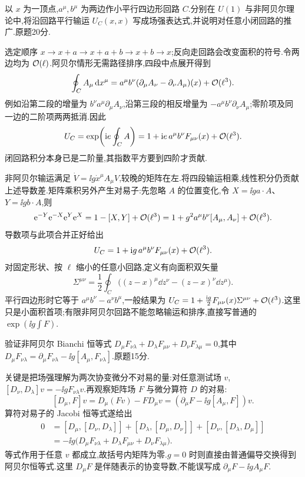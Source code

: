 \begin{exercise}
以 $x$ 为一顶点,$a^\mu,b^\mu$ 为两边作小平行四边形回路 $C$.分别在 $U(1)$ 与非阿贝尔理论中,将沿回路平行输运 $U_C(x,x)$ 写成场强表达式,并说明对任意小闭回路的推广.原题20分.
\end{exercise}
\begin{solution}
选定顺序 $x\to x+a\to x+a+b\to x+b\to x$;反向走回路会改变面积的符号.令两边均为 $\mathcal O(\ell)$.阿贝尔情形无需路径排序,四段中点展开得到
\[
\oint_C A_\mu\,\mathrm d x^\mu
=a^\mu b^\nu(\partial_\mu A_\nu-\partial_\nu A_\mu)(x)+\mathcal O(\ell^3).
\]
例如沿第二段的增量为 $b^\nu a^\mu\partial_\mu A_\nu$,沿第三段的相反增量为 $-a^\mu b^\nu\partial_\nu A_\mu$;零阶项及同一边的二阶项两两抵消.因此
\[
U_C=\exp\!\left(\mathrm i e\oint_C A\right)
=1+\mathrm i e\,a^\mu b^\nu F_{\mu\nu}(x)+\mathcal O(\ell^3).
\]
闭回路积分本身已是二阶量,其指数平方要到四阶才贡献.

非阿贝尔输运满足 $\dot V=\ii g\dot x^\mu A_\mu V$,较晚的矩阵在左.将四段输运相乘,线性积分仍贡献上述导数差.矩阵乘积另外产生对易子:先忽略 $A$ 的位置变化,令 $X=\ii g a\cdot A$、$Y=\ii g b\cdot A$,则
\[
\mathrm e^{-Y}\mathrm e^{-X}\mathrm e^Y\mathrm e^X
=1-[X,Y]+\mathcal O(\ell^3)
=1+g^2a^\mu b^\nu[A_\mu,A_\nu]+\mathcal O(\ell^3).
\]
导数项与此项合并正好给出
\[
U_C=1+\mathrm i g\,a^\mu b^\nu F_{\mu\nu}(x)+\mathcal O(\ell^3).
\]
对固定形状、按 $\ell$ 缩小的任意小回路,定义有向面积双矢量
\[
\Sigma^{\mu\nu}=\frac12\oint_C
\bigl((z-x)^\mu\dd z^\nu-(z-x)^\nu\dd z^\mu\bigr).
\]
平行四边形时它等于 $a^\mu b^\nu-a^\nu b^\mu$,一般结果为 $U_C=1+\frac{\mathrm i g}{2}F_{\mu\nu}(x)\Sigma^{\mu\nu}+\mathcal O(\ell^3)$.这里只是小面积首项;有限非阿贝尔回路不能忽略输运和排序,直接写普通的 $\exp(\ii g\int F)$.
\end{solution}

\begin{exercise}
验证非阿贝尔 Bianchi 恒等式 $D_\mu F_{\nu\lambda}+D_\lambda F_{\mu\nu}+D_\nu F_{\lambda\mu}=0$,其中 $D_\mu F_{\nu\lambda}=\partial_\mu F_{\nu\lambda}-\ii g[A_\mu,F_{\nu\lambda}]$.原题15分.
\end{exercise}
\begin{solution}
关键是把场强理解为两次协变微分不对易的量:对任意测试场 $v$,$[D_\nu,D_\lambda]v=-\ii gF_{\nu\lambda}v$.再观察矩阵场 $F$ 与微分算符 $D$ 的对易:
\[
[D_\mu,F]v=D_\mu(Fv)-FD_\mu v
=(\partial_\mu F-\ii g[A_\mu,F])v.
\]
算符对易子的 Jacobi 恒等式遂给出
\begin{align*}
0&=[D_\mu,[D_\nu,D_\lambda]]
+[D_\lambda,[D_\mu,D_\nu]]+[D_\nu,[D_\lambda,D_\mu]]\\
&=-\ii g\bigl(D_\mu F_{\nu\lambda}+D_\lambda F_{\mu\nu}+D_\nu F_{\lambda\mu}\bigr).
\end{align*}
等式作用于任意 $v$ 都成立,故括号内矩阵为零.$g=0$ 时则直接由普通偏导交换得到阿贝尔恒等式.这里 $D_\mu F$ 是伴随表示的协变导数,不能误写成 $\partial_\mu F-\ii gA_\mu F$.
\end{solution}

